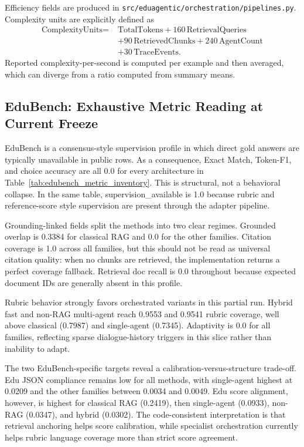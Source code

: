Efficiency fields are produced in \texttt{src/eduagentic/orchestration/pipelines.py}. Complexity units are explicitly defined as
\begin{equation}
\begin{aligned}
\text{ComplexityUnits} =\;& \text{TotalTokens} + 160\,\text{RetrievalQueries} \\
&+ 90\,\text{RetrievedChunks} + 240\,\text{AgentCount} \\
&+ 30\,\text{TraceEvents}.
\end{aligned}
\end{equation}
Reported complexity-per-second is computed per example and then averaged, which can diverge from a ratio computed from summary means.

\subsection{EduBench: Exhaustive Metric Reading at Current Freeze}
EduBench is a consensus-style supervision profile in which direct gold answers are typically unavailable in public rows. As a consequence, Exact Match, Token-F1, and choice accuracy are all 0.0 for every architecture in Table~\ref{tab:edubench_metric_inventory}. This is structural, not a behavioral collapse. In the same table, supervision\_available is 1.0 because rubric and reference-score style supervision are present through the adapter pipeline.

Grounding-linked fields split the methods into two clear regimes. Grounded overlap is 0.3384 for classical RAG and 0.0 for the other families. Citation coverage is 1.0 across all families, but this should not be read as universal citation quality: when no chunks are retrieved, the implementation returns a perfect coverage fallback. Retrieval doc recall is 0.0 throughout because expected document IDs are generally absent in this profile.

Rubric behavior strongly favors orchestrated variants in this partial run. Hybrid fast and non-RAG multi-agent reach 0.9553 and 0.9541 rubric coverage, well above classical (0.7987) and single-agent (0.7345). Adaptivity is 0.0 for all families, reflecting sparse dialogue-history triggers in this slice rather than inability to adapt.

The two EduBench-specific targets reveal a calibration-versus-structure trade-off. Edu JSON compliance remains low for all methods, with single-agent highest at 0.0209 and the other families between 0.0034 and 0.0049. Edu score alignment, however, is highest for classical RAG (0.2419), then single-agent (0.0933), non-RAG (0.0347), and hybrid (0.0302). The code-consistent interpretation is that retrieval anchoring helps score calibration, while specialist orchestration currently helps rubric language coverage more than strict score agreement.

